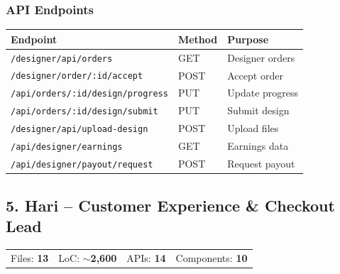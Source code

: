 \documentclass[a4paper,11pt]{article}
\begin{document}
\subsubsection{API Endpoints}
\begin{tabular}{@{}L{6cm}L{2cm}L{4.5cm}@{}}
\toprule
{}
\textbf{Endpoint} & \textbf{Method} & \textbf{Purpose} \\
\midrule
\texttt{/designer/api/orders}           & GET  & Designer orders \\
\texttt{/designer/order/:id/accept}     & POST & Accept order \\
\texttt{/api/orders/:id/design/progress}& PUT  & Update progress \\
\texttt{/api/orders/:id/design/submit}  & PUT  & Submit design \\
\texttt{/designer/api/upload-design}    & POST & Upload files \\
\texttt{/api/designer/earnings}         & GET  & Earnings data \\
\texttt{/api/designer/payout/request}   & POST & Request payout \\
\bottomrule
\end{tabular}

\subsection{\textcolor{hariCol}{5. Hari} -- Customer Experience \& Checkout Lead}

\begin{mdframed}[linecolor=hariCol!60, backgroundcolor=hariCol!5, roundcorner=4pt]
\begin{tabular}{@{}L{3cm}L{3cm}L{3cm}L{3cm}@{}}
  Files: \textbf{13} & LoC: \textbf{$\sim$2,600} & APIs: \textbf{14} & Components: \textbf{10}
\end{tabular}
\end{mdframed}
\end{document}
